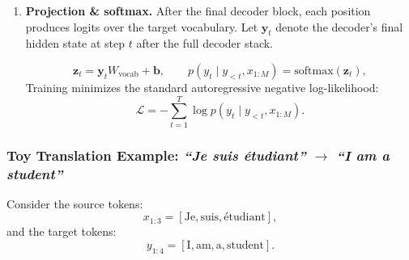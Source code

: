 \begin{enumerate}
	\noindent
	\textbf{Masks, autoregression, and training efficiency.}
	At \emph{inference}, the decoder is unavoidably sequential:
	we generate \(y_1\), feed it back, then generate \(y_2\), and so on.
	This matches the autoregressive factorization:
	\[
	p(y_{1:T}\mid x_{1:M})
	=
	\prod_{t=1}^{T} p(y_t \mid y_{<t}, x_{1:M}).
	\]
	At \emph{training}, however, we can compute all conditional terms in parallel using teacher forcing:
	the decoder receives the \emph{shifted} ground-truth sequence
	\([\texttt{<BOS>}, y_1, \dots, y_{T-1}]\),
	while the causal mask prevents position \(t\) from attending to \(>t\).
	This preserves the same autoregressive objective \emph{without cheating},
	but allows the entire target sequence to be processed in a single forward pass.
	
	\noindent
	This is more efficient than RNN/LSTM decoders for two reasons:
	\begin{itemize}
		\item Even with teacher forcing, an RNN/LSTM decoder must still be \emph{unrolled in time},
		so the training computation contains an irreducible sequential chain of length \(T\).
		\item The Transformer decoder replaces this temporal dependency with masked attention,
		so the per-layer computation is dominated by parallel matrix operations that exploit GPU throughput.
	\end{itemize}
	
	\item \textbf{Projection \& softmax.}
	After the final decoder block, each position produces logits over the target vocabulary. \noindent
	Let \(\mathbf{y}_t\) denote the decoder’s final hidden state at step \(t\) after the full decoder stack.
	
	\[
	\mathbf{z}_t = \mathbf{y}_t W_{\text{vocab}} + \mathbf{b},
	\qquad
	p(y_t \mid y_{<t}, x_{1:M}) = \text{softmax}(\mathbf{z}_t),
	\]
	Training minimizes the standard autoregressive negative log-likelihood:
	\[
	\mathcal{L}
	=
	-\sum_{t=1}^{T}
	\log p(y_t \mid y_{<t}, x_{1:M}).
	\]
\end{enumerate}

\subsubsection{Toy Translation Example: \textit{``Je suis \'{e}tudiant''} \(\rightarrow\) \textit{``I am a student''}}
\label{subsubsec:chapter17_toy_transformer_translation}

\noindent
Consider the source tokens:
\[
x_{1:3} = [\text{Je}, \text{suis}, \text{\'{e}tudiant}],
\]
and the target tokens:
\[
y_{1:4} = [\text{I}, \text{am}, \text{a}, \text{student}].
\]

